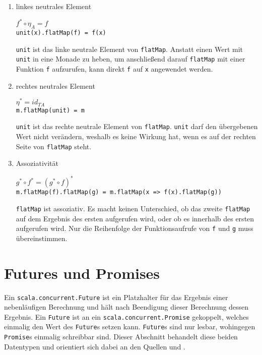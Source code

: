 \begin{enumerate}
  \item linkes neutrales Element

    $f^* \circ \eta_A = f$\\
    \lstinline|unit(x).flatMap(f) = f(x)|

    \lstinline|unit| ist das linke neutrale Element von \lstinline|flatMap|.
    Anstatt einen Wert mit \lstinline|unit| in eine Monade zu heben, um anschließend darauf \lstinline|flatMap| mit einer Funktion \lstinline|f| aufzurufen, kann direkt \lstinline|f| auf \lstinline|x| angewendet werden.

  \item rechtes neutrales Element

    $\eta^* = id_{T A}$\\
    \lstinline|m.flatMap(unit) = m|

    \lstinline|unit| ist das rechte neutrale Element von \lstinline|flatMap|.
    \lstinline|unit| darf den übergebenen Wert nicht verändern, weshalb es keine Wirkung hat, wenn es auf der rechten Seite von \lstinline|flatMap| steht.

  \item Assoziativität

    $g^* \circ f^* = (g^* \circ f)^*$\\
    \lstinline|m.flatMap(f).flatMap(g) = m.flatMap(x => f(x).flatMap(g))|

    \lstinline|flatMap| ist assoziativ.
    Es macht keinen Unterschied, ob das zweite \lstinline|flatMap| auf dem Ergebnis des ersten aufgerufen wird, oder ob es innerhalb des ersten aufgerufen wird.
    Nur die Reihenfolge der Funktionsaufrufe von \lstinline|f| und \lstinline|g| muss übereinstimmen.
\end{enumerate}




\section{Futures und Promises} %
\label{sec:futures_und_promises}

Ein \lstinline|scala.concurrent.Future| ist ein Platzhalter für das Ergebnis einer nebenläufigen Berechnung und hält nach Beendigung dieser Berechnung dessen Ergebnis.
Ein \lstinline|Future| ist an ein \lstinline|scala.concurrent.Promise| gekoppelt, welches einmalig den Wert des \lstinline|Future|s setzen kann.
\lstinline|Future|s sind nur lesbar, wohingegen \lstinline|Promise|s einmalig schreibbar sind.
Dieser Abschnitt behandelt diese beiden Datentypen und orientiert sich dabei an den Quellen \citealt{futures_scala} und \citealt{futures_akka}.

